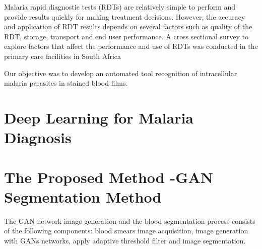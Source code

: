 Malaria rapid diagnostic tests (RDTs) are relatively simple to perform and provide results quickly for making treatment decisions. However, the accuracy and application of RDT
results depends on several factors such as quality of the RDT, storage, transport and end user performance. A cross sectional survey to explore factors that affect the performance and use of
RDTs was conducted in the primary care facilities in South Africa \cite{Moonasar2007}

Our objective was to develop an automated tool recognition of intracellular malaria parasites in stained blood films.    

\section{Deep Learning for Malaria Diagnosis}

\section{The Proposed Method -GAN Segmentation Method}
\label{segmethod}


The GAN network image generation and the blood segmentation process consists of the following components: blood smears image acquisition, image generation with GANs networks,  apply adaptive threshold filter and image segmentation.



